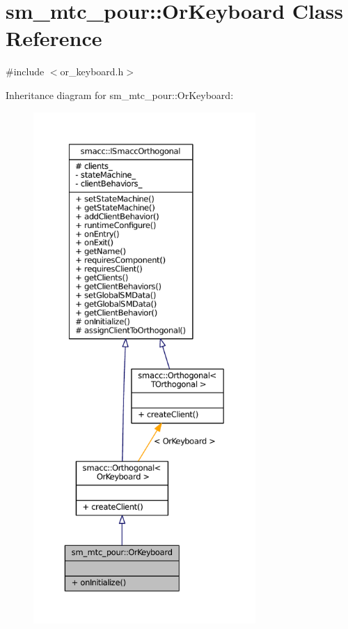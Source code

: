 \hypertarget{classsm__mtc__pour_1_1OrKeyboard}{}\section{sm\+\_\+mtc\+\_\+pour\+:\+:Or\+Keyboard Class Reference}
\label{classsm__mtc__pour_1_1OrKeyboard}


{\ttfamily \#include $<$or\+\_\+keyboard.\+h$>$}



Inheritance diagram for sm\+\_\+mtc\+\_\+pour\+:\+:Or\+Keyboard\+:
\nopagebreak
\begin{figure}[H]
\begin{center}
\leavevmode
\includegraphics[height=550pt]{classsm__mtc__pour_1_1OrKeyboard__inherit__graph}
\end{center}
\end{figure}


